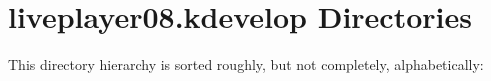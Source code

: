 \section{liveplayer08.kdevelop Directories}
This directory hierarchy is sorted roughly, but not completely, alphabetically:\begin{CompactList}
\item {}
\begin{CompactList}
\item {}
\end{CompactList}
\end{CompactList}
